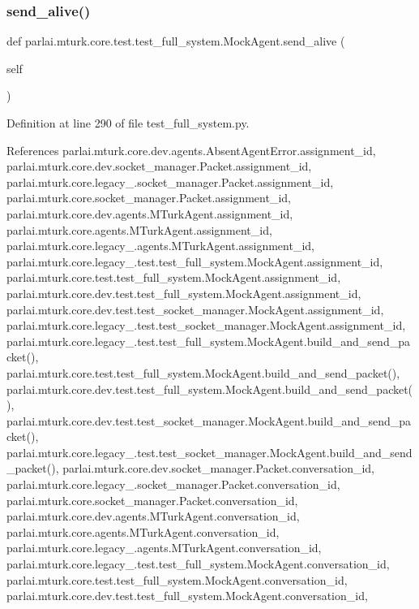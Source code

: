 \subsubsection{\texorpdfstring{send\+\_\+alive()}{send\_alive()}}
{\footnotesize\ttfamily def parlai.\+mturk.\+core.\+test.\+test\+\_\+full\+\_\+system.\+Mock\+Agent.\+send\+\_\+alive (\begin{DoxyParamCaption}\item[{}]{self }\end{DoxyParamCaption})}



Definition at line 290 of file test\+\_\+full\+\_\+system.\+py.



References parlai.\+mturk.\+core.\+dev.\+agents.\+Absent\+Agent\+Error.\+assignment\+\_\+id, parlai.\+mturk.\+core.\+dev.\+socket\+\_\+manager.\+Packet.\+assignment\+\_\+id, parlai.\+mturk.\+core.\+legacy\+\_.\+socket\+\_\+manager.\+Packet.\+assignment\+\_\+id, parlai.\+mturk.\+core.\+socket\+\_\+manager.\+Packet.\+assignment\+\_\+id, parlai.\+mturk.\+core.\+dev.\+agents.\+M\+Turk\+Agent.\+assignment\+\_\+id, parlai.\+mturk.\+core.\+agents.\+M\+Turk\+Agent.\+assignment\+\_\+id, parlai.\+mturk.\+core.\+legacy\+\_.\+agents.\+M\+Turk\+Agent.\+assignment\+\_\+id, parlai.\+mturk.\+core.\+legacy\+\_.\+test.\+test\+\_\+full\+\_\+system.\+Mock\+Agent.\+assignment\+\_\+id, parlai.\+mturk.\+core.\+test.\+test\+\_\+full\+\_\+system.\+Mock\+Agent.\+assignment\+\_\+id, parlai.\+mturk.\+core.\+dev.\+test.\+test\+\_\+full\+\_\+system.\+Mock\+Agent.\+assignment\+\_\+id, parlai.\+mturk.\+core.\+dev.\+test.\+test\+\_\+socket\+\_\+manager.\+Mock\+Agent.\+assignment\+\_\+id, parlai.\+mturk.\+core.\+legacy\+\_.\+test.\+test\+\_\+socket\+\_\+manager.\+Mock\+Agent.\+assignment\+\_\+id, parlai.\+mturk.\+core.\+legacy\+\_.\+test.\+test\+\_\+full\+\_\+system.\+Mock\+Agent.\+build\+\_\+and\+\_\+send\+\_\+packet(), parlai.\+mturk.\+core.\+test.\+test\+\_\+full\+\_\+system.\+Mock\+Agent.\+build\+\_\+and\+\_\+send\+\_\+packet(), parlai.\+mturk.\+core.\+dev.\+test.\+test\+\_\+full\+\_\+system.\+Mock\+Agent.\+build\+\_\+and\+\_\+send\+\_\+packet(), parlai.\+mturk.\+core.\+dev.\+test.\+test\+\_\+socket\+\_\+manager.\+Mock\+Agent.\+build\+\_\+and\+\_\+send\+\_\+packet(), parlai.\+mturk.\+core.\+legacy\+\_.\+test.\+test\+\_\+socket\+\_\+manager.\+Mock\+Agent.\+build\+\_\+and\+\_\+send\+\_\+packet(), parlai.\+mturk.\+core.\+dev.\+socket\+\_\+manager.\+Packet.\+conversation\+\_\+id, parlai.\+mturk.\+core.\+legacy\+\_.\+socket\+\_\+manager.\+Packet.\+conversation\+\_\+id, parlai.\+mturk.\+core.\+socket\+\_\+manager.\+Packet.\+conversation\+\_\+id, parlai.\+mturk.\+core.\+dev.\+agents.\+M\+Turk\+Agent.\+conversation\+\_\+id, parlai.\+mturk.\+core.\+agents.\+M\+Turk\+Agent.\+conversation\+\_\+id, parlai.\+mturk.\+core.\+legacy\+\_.\+agents.\+M\+Turk\+Agent.\+conversation\+\_\+id, parlai.\+mturk.\+core.\+legacy\+\_.\+test.\+test\+\_\+full\+\_\+system.\+Mock\+Agent.\+conversation\+\_\+id, parlai.\+mturk.\+core.\+test.\+test\+\_\+full\+\_\+system.\+Mock\+Agent.\+conversation\+\_\+id, parlai.\+mturk.\+core.\+dev.\+test.\+test\+\_\+full\+\_\+system.\+Mock\+Agent.\+conversation\+\_\+id, 